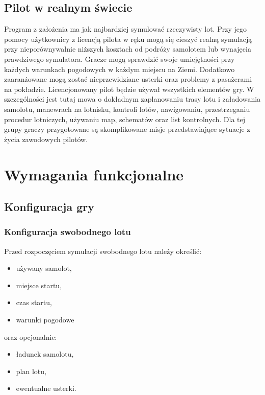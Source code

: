 \documentclass{mwrep}
\begin{document}
\section{Pilot w realnym świecie}

Program z założenia ma jak najbardziej symulować rzeczywisty lot. Przy jego pomocy użytkownicy z licencją pilota w ręku mogą się cieszyć realną symulacją przy nieporównywalnie niższych kosztach od podróży samolotem lub wynajęcia prawdziwego symulatora. Gracze mogą sprawdzić swoje umiejętności przy każdych warunkach pogodowych w każdym miejscu na Ziemi. Dodatkowo zaaranżowane mogą zostać nieprzewidziane usterki oraz problemy z pasażerami na pokładzie. Licencjonowany pilot będzie używał wszystkich elementów gry. W szczególności jest tutaj mowa o dokładnym zaplanowaniu trasy lotu i załadowania samolotu, manewrach na lotnisku, kontroli lotów, nawigowaniu, przestrzeganiu procedur lotniczych, używaniu map, schematów oraz list kontrolnych. Dla tej grupy graczy przygotowane są skomplikowane misje przedstawiające sytuacje z życia zawodowych pilotów.

\chapter{Wymagania funkcjonalne}

\section{Konfiguracja gry}

\subsection{Konfiguracja swobodnego lotu}

Przed rozpoczęciem symulacji swobodnego lotu należy określić:
\begin{itemize}
\item używany samolot,
\item miejsce startu,
\item czas startu,
\item warunki pogodowe
\end{itemize}
oraz opcjonalnie:
\begin{itemize}
\item ładunek samolotu,
\item plan lotu,
\item ewentualne usterki.
\end{itemize}
\end{document}
